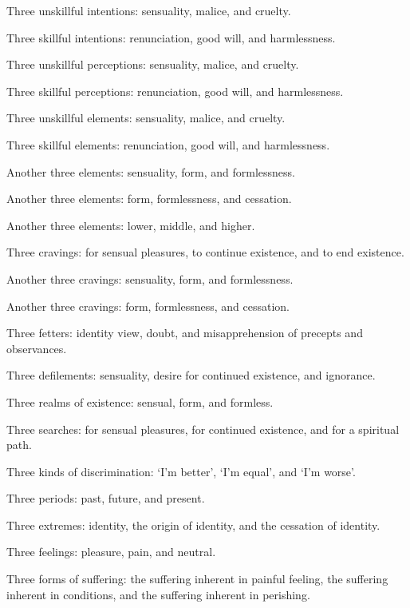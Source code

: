 \documentclass[12pt,openany]{book}%
\begin{document}
Three unskillful intentions: sensuality, malice, and cruelty. 

Three skillful intentions: renunciation, good will, and harmlessness. 

Three unskillful perceptions: sensuality, malice, and cruelty. 

Three skillful perceptions: renunciation, good will, and harmlessness. 

Three unskillful elements: sensuality, malice, and cruelty. 

Three skillful elements: renunciation, good will, and harmlessness. 

Another three elements: sensuality, form, and formlessness. 

Another three elements: form, formlessness, and cessation. 

Another three elements: lower, middle, and higher. 

Three cravings: for sensual pleasures, to continue existence, and to end existence. 

Another three cravings: sensuality, form, and formlessness. 

Another three cravings: form, formlessness, and cessation. 

Three fetters: identity view, doubt, and misapprehension of precepts and observances. 

Three defilements: sensuality, desire for continued existence, and ignorance. 

Three realms of existence: sensual, form, and formless. 

Three searches: for sensual pleasures, for continued existence, and for a spiritual path. 

Three kinds of discrimination: ‘I’m better’, ‘I’m equal’, and ‘I’m worse’. 

Three periods: past, future, and present. 

Three extremes: identity, the origin of identity, and the cessation of identity. 

Three feelings: pleasure, pain, and neutral. 

Three forms of suffering: the suffering inherent in painful feeling, the suffering inherent in conditions, and the suffering inherent in perishing. 
\end{document}
